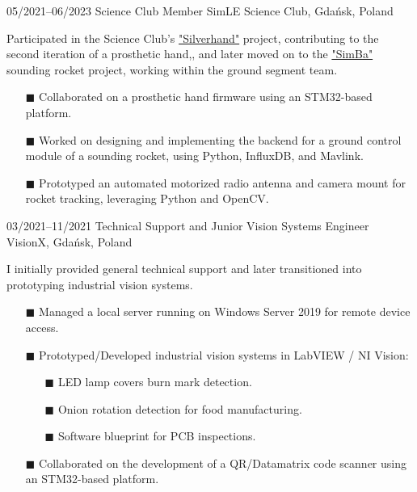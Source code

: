 \documentclass[9pt]{./src/packages/Developer_CV/developercv}
\begin{document}
\begin{entrylist}
{\begin{enumerate}
\begin{enumerate}
        \end{enumerate}
    \end{enumerate}
    }
    \entry
        {05/2021--06/2023}
        {Science Club Member}
        {SimLE Science Club, Gdańsk, Poland}
        {
            Participated in the Science Club’s \href{https://simle.pl/en/projekty/silverhand/}{"Silverhand"} project, contributing to the second iteration of a prosthetic hand,, and later moved on to the \href{https://simle.pl/en/projekty/simba/}{"SimBa"} sounding rocket project, working within the ground segment team.
        \begin{enumerate}
            \item[$\blacksquare$] Collaborated on a prosthetic hand firmware using an STM32-based platform.
            \item[$\blacksquare$] Worked on designing and implementing the backend for a ground control module of a sounding rocket, using Python, InfluxDB, and Mavlink.
            \item[$\blacksquare$] Prototyped an automated motorized radio antenna and camera mount for rocket tracking, leveraging Python and OpenCV.
        \end{enumerate}
        }
    \entry
        {03/2021--11/2021}
        {Technical Support and Junior Vision Systems Engineer}
        {VisionX, Gdańsk, Poland}
        {
        I initially provided general technical support and later transitioned into prototyping industrial vision systems.
        \begin{enumerate}
            \item[$\blacksquare$] Managed a local server running on Windows Server 2019 for remote device access.
            \item[$\blacksquare$] Prototyped/Developed industrial vision systems in LabVIEW / NI Vision:
            \begin{enumerate}
                \item[$\blacksquare$] LED lamp covers burn mark detection.
                \item[$\blacksquare$] Onion rotation detection for food manufacturing.
                \item[$\blacksquare$] Software blueprint for PCB inspections.
            \end{enumerate}
            \item[$\blacksquare$] Collaborated on the development of a QR/Datamatrix code scanner using an STM32-based platform.
        \end{enumerate}
        }
    \end{entrylist}
\end{document}
